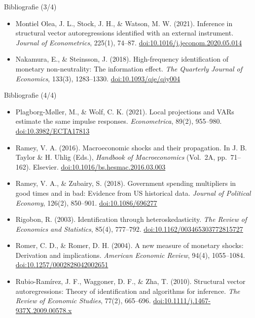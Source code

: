 \begin{frame}{Bibliografie (3/4)}
\begin{itemize}
    \item Montiel Olea, J. L., Stock, J. H., \& Watson, M. W. (2021). Inference in structural vector autoregressions identified with an external instrument. \textit{Journal of Econometrics}, 225(1), 74--87. \href{https://doi.org/10.1016/j.jeconom.2020.05.014}{doi:10.1016/j.jeconom.2020.05.014}
    \item Nakamura, E., \& Steinsson, J. (2018). High-frequency identification of monetary non-neutrality: The information effect. \textit{The Quarterly Journal of Economics}, 133(3), 1283--1330. \href{https://doi.org/10.1093/qje/qjy004}{doi:10.1093/qje/qjy004}
\end{itemize}
\end{frame}

\begin{frame}{Bibliografie (4/4)}
\itemsize{\tiny}
\begin{itemize}
    \item Plagborg-Møller, M., \& Wolf, C. K. (2021). Local projections and VARs estimate the same impulse responses. \textit{Econometrica}, 89(2), 955--980. \href{https://doi.org/10.3982/ECTA17813}{doi:10.3982/ECTA17813}
    \item Ramey, V. A. (2016). Macroeconomic shocks and their propagation. In J. B. Taylor \& H. Uhlig (Eds.), \textit{Handbook of Macroeconomics} (Vol.\ 2A, pp.\ 71--162). Elsevier. \href{https://doi.org/10.1016/bs.hesmac.2016.03.003}{doi:10.1016/bs.hesmac.2016.03.003}
    \item Ramey, V. A., \& Zubairy, S. (2018). Government spending multipliers in good times and in bad: Evidence from US historical data. \textit{Journal of Political Economy}, 126(2), 850--901. \href{https://doi.org/10.1086/696277}{doi:10.1086/696277}
    \item Rigobon, R. (2003). Identification through heteroskedasticity. \textit{The Review of Economics and Statistics}, 85(4), 777--792. \href{https://doi.org/10.1162/003465303772815727}{doi:10.1162/003465303772815727}
    \item Romer, C. D., \& Romer, D. H. (2004). A new measure of monetary shocks: Derivation and implications. \textit{American Economic Review}, 94(4), 1055--1084. \href{https://doi.org/10.1257/0002828042002651}{doi:10.1257/0002828042002651}
    \item Rubio-Ramírez, J. F., Waggoner, D. F., \& Zha, T. (2010). Structural vector autoregressions: Theory of identification and algorithms for inference. \textit{The Review of Economic Studies}, 77(2), 665--696. \href{https://doi.org/10.1111/j.1467-937X.2009.00578.x}{doi:10.1111/j.1467-937X.2009.00578.x}

\end{itemize}
\end{frame}
